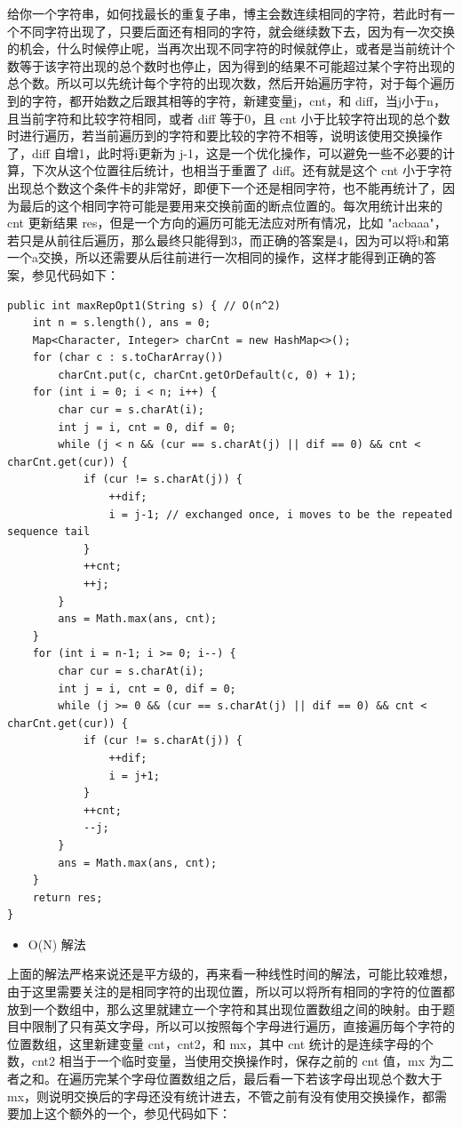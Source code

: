 \documentclass[9pt, b5paaper]{book}
\begin{document}
给你一个字符串，如何找最长的重复子串，博主会数连续相同的字符，若此时有一个不同字符出现了，只要后面还有相同的字符，就会继续数下去，因为有一次交换的机会，什么时候停止呢，当再次出现不同字符的时候就停止，或者是当前统计个数等于该字符出现的总个数时也停止，因为得到的结果不可能超过某个字符出现的总个数。所以可以先统计每个字符的出现次数，然后开始遍历字符，对于每个遍历到的字符，都开始数之后跟其相等的字符，新建变量j，cnt，和 diff，当j小于n，且当前字符和比较字符相同，或者 diff 等于0，且 cnt 小于比较字符出现的总个数时进行遍历，若当前遍历到的字符和要比较的字符不相等，说明该使用交换操作了，diff 自增1，此时将i更新为 j-1，这是一个优化操作，可以避免一些不必要的计算，下次从这个位置往后统计，也相当于重置了 diff。还有就是这个 cnt 小于字符出现总个数这个条件卡的非常好，即便下一个还是相同字符，也不能再统计了，因为最后的这个相同字符可能是要用来交换前面的断点位置的。每次用统计出来的 cnt 更新结果 res，但是一个方向的遍历可能无法应对所有情况，比如 "acbaaa"，若只是从前往后遍历，那么最终只能得到3，而正确的答案是4，因为可以将b和第一个a交换，所以还需要从后往前进行一次相同的操作，这样才能得到正确的答案，参见代码如下：

\begin{verbatim}
public int maxRepOpt1(String s) { // O(n^2)
    int n = s.length(), ans = 0;
    Map<Character, Integer> charCnt = new HashMap<>();
    for (char c : s.toCharArray()) 
        charCnt.put(c, charCnt.getOrDefault(c, 0) + 1);
    for (int i = 0; i < n; i++) {
        char cur = s.charAt(i);
        int j = i, cnt = 0, dif = 0;
        while (j < n && (cur == s.charAt(j) || dif == 0) && cnt < charCnt.get(cur)) {
            if (cur != s.charAt(j)) {
                ++dif;
                i = j-1; // exchanged once, i moves to be the repeated sequence tail
            }
            ++cnt;
            ++j;
        }
        ans = Math.max(ans, cnt);
    }
    for (int i = n-1; i >= 0; i--) {
        char cur = s.charAt(i);
        int j = i, cnt = 0, dif = 0;
        while (j >= 0 && (cur == s.charAt(j) || dif == 0) && cnt < charCnt.get(cur)) {
            if (cur != s.charAt(j)) {
                ++dif;
                i = j+1;
            }
            ++cnt;
            --j;
        }
        ans = Math.max(ans, cnt);
    }
    return res;
}
\end{verbatim}
\begin{itemize}
\item O(N) 解法
\end{itemize}

上面的解法严格来说还是平方级的，再来看一种线性时间的解法，可能比较难想，由于这里需要关注的是相同字符的出现位置，所以可以将所有相同的字符的位置都放到一个数组中，那么这里就建立一个字符和其出现位置数组之间的映射。由于题目中限制了只有英文字母，所以可以按照每个字母进行遍历，直接遍历每个字符的位置数组，这里新建变量 cnt，cnt2，和 mx，其中 cnt 统计的是连续字母的个数，cnt2 相当于一个临时变量，当使用交换操作时，保存之前的 cnt 值，mx 为二者之和。在遍历完某个字母位置数组之后，最后看一下若该字母出现总个数大于 mx，则说明交换后的字母还没有统计进去，不管之前有没有使用交换操作，都需要加上这个额外的一个，参见代码如下：
\end{document}
